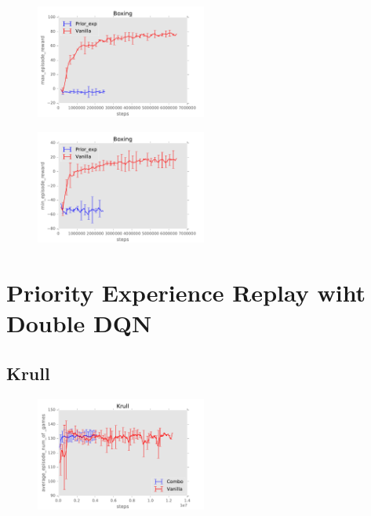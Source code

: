 \documentclass{sig-alternate}
\begin{document}
\begin{figure}
    \centering
    \includegraphics[width=0.5\textwidth]{../results/Boxing/Comparisons/Prior_exp/Prior_exp-baseline-max_episode_reward.pdf}
\end{figure}


\begin{figure}
    \centering
    \includegraphics[width=0.5\textwidth]{../results/Boxing/Comparisons/Prior_exp/Prior_exp-baseline-min_episode_reward.pdf}
\end{figure}

\FloatBarrier

\section{Priority Experience Replay wiht Double DQN}\label{Appendix Priority Experience Replay Double DQN}

\subsection{Krull}\label{Appendix prior krill}

\begin{figure}
    \centering
    \includegraphics[width=0.5\textwidth]{../results/Krull/Comparisons/Combo/Combo-baseline-average_episode_num_of_games.pdf}
\end{figure}
\end{document}
